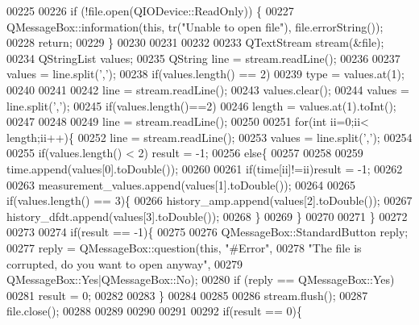 \begin{DoxyCode}
00225 
00226         \textcolor{keywordflow}{if} (!file.open(QIODevice::ReadOnly)) \{
00227             QMessageBox::information(\textcolor{keyword}{this}, tr(\textcolor{stringliteral}{"Unable to open file"}), file.errorString());
00228             \textcolor{keywordflow}{return};
00229         \}
00230 
00231 
00232 
00233         QTextStream stream(&file);
00234         QStringList values;
00235         QString line = stream.readLine();
00236 
00237         values = line.split(\textcolor{charliteral}{','});
00238         \textcolor{keywordflow}{if}(values.length() == 2)
00239         type = values.at(1);
00240 
00241 
00242         line = stream.readLine();
00243         values.clear();
00244         values = line.split(\textcolor{charliteral}{','});
00245         \textcolor{keywordflow}{if}(values.length()==2)
00246         length = values.at(1).toInt();
00247 
00248 
00249             line = stream.readLine();
00250 
00251             \textcolor{keywordflow}{for}(\textcolor{keywordtype}{int} ii=0;ii< length;ii++)\{
00252                 line = stream.readLine();
00253                 values = line.split(\textcolor{charliteral}{','});
00254 
00255                 \textcolor{keywordflow}{if}(values.length() < 2) result = -1;
00256                 \textcolor{keywordflow}{else}\{
00257 
00258 
00259                 time.append(values[0].toDouble());
00260 
00261                 \textcolor{keywordflow}{if}(time[ii]!=ii)result = -1;
00262 
00263                 measurement\_values.append(values[1].toDouble());
00264 
00265                 \textcolor{keywordflow}{if}(values.length() == 3)\{
00266                  history\_amp.append(values[2].toDouble());
00267                  history\_dfdt.append(values[3].toDouble());
00268                 \}
00269                 \}
00270 
00271             \}
00272 
00273 
00274             \textcolor{keywordflow}{if}(result == -1)\{
00275 
00276                  QMessageBox::StandardButton reply;
00277                  reply = QMessageBox::question(\textcolor{keyword}{this}, \textcolor{stringliteral}{"#Error"},
00278                                                \textcolor{stringliteral}{"The file is corrupted, do you want to open anyway"},
00279                                                QMessageBox::Yes|QMessageBox::No);
00280                  \textcolor{keywordflow}{if} (reply == QMessageBox::Yes)
00281                   result = 0;
00282 
00283             \}
00284 
00285 
00286        stream.flush();
00287        file.close();
00288 
00289 
00290 
00291 
00292         \textcolor{keywordflow}{if}(result == 0)\{

\end{DoxyCode}
